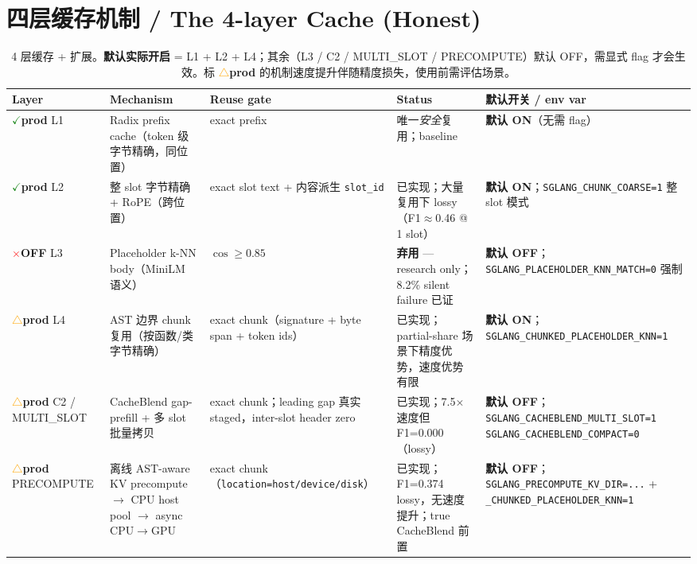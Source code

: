 \documentclass[11pt,a4paper]{article}
\begin{document}
\section{四层缓存机制 / The 4-layer Cache (Honest)}

\begin{table}[h]
\centering\small
\renewcommand{\arraystretch}{1.18}
\begin{tabular}{@{}p{1.1cm}p{3.8cm}p{3.8cm}p{3.6cm}p{3.5cm}@{}}
\toprule
\textbf{Layer} & \textbf{Mechanism} & \textbf{Reuse gate} & \textbf{Status} & \textbf{默认开关 / env var} \\
\midrule
\textcolor{ForestGreen}{$\checkmark$}\textbf{prod} \newline L1 &
Radix prefix cache（token 级字节精确，同位置）&
exact prefix&
唯一\emph{安全}复用；baseline&
\textbf{默认 ON}（无需 flag）\\
\textcolor{ForestGreen}{$\checkmark$}\textbf{prod} \newline L2 &
整 slot 字节精确 + RoPE（跨位置）&
exact slot text + 内容派生 \texttt{slot\_id}&
已实现；大量复用下 lossy（F1$\approx$0.46 @ 1 slot）&
\textbf{默认 ON}；\texttt{SGLANG\_CHUNK\_COARSE=1} 整 slot 模式 \\
\textcolor{red}{$\times$}\textbf{OFF} \newline L3 &
Placeholder k-NN body（MiniLM 语义）&
$\cos\!\geq\!0.85$&
\textbf{弃用} --- research only；8.2\% silent failure 已证&
\textbf{默认 OFF}；\texttt{SGLANG\_PLACEHOLDER\_KNN\_MATCH=0} 强制 \\
\textcolor{orange}{$\triangle$}\textbf{prod\*} \newline L4 &
AST 边界 chunk 复用（按函数/类字节精确）&
exact chunk（signature + byte span + token ids）&
已实现；partial-share 场景下精度优势，速度优势有限&
\textbf{默认 ON}；\texttt{SGLANG\_CHUNKED\_PLACEHOLDER\_KNN=1} \\
\textcolor{orange}{$\triangle$}\textbf{prod\*} \newline C2 / MULTI\_SLOT &
CacheBlend gap-prefill + 多 slot 批量拷贝&
exact chunk；leading gap 真实 staged，inter-slot header zero&
已实现；7.5$\times$ 速度但 F1=0.000（lossy）&
\textbf{默认 OFF}；\texttt{SGLANG\_CACHEBLEND\_MULTI\_SLOT=1 SGLANG\_CACHEBLEND\_COMPACT=0} \\
\textcolor{orange}{$\triangle$}\textbf{prod\*} \newline PRECOMPUTE &
离线 AST-aware KV precompute $\to$ CPU host pool $\to$ async CPU$\to$GPU&
exact chunk（\texttt{location=host/device/disk}）&
已实现；F1=0.374 lossy，无速度提升；true CacheBlend 前置&
\textbf{默认 OFF}；\texttt{SGLANG\_PRECOMPUTE\_KV\_DIR=...} + \texttt{\_CHUNKED\_PLACEHOLDER\_KNN=1} \\
\bottomrule
\end{tabular}
\caption{4 层缓存 + 扩展。\textbf{默认实际开启} = L1 + L2 + L4；其余（L3 / C2 / MULTI\_SLOT / PRECOMPUTE）默认 OFF，需显式 flag 才会生效。标 \textcolor{orange}{$\triangle$}\textbf{prod\*} 的机制速度提升伴随精度损失，使用前需评估场景。}
\end{table}
\end{document}
